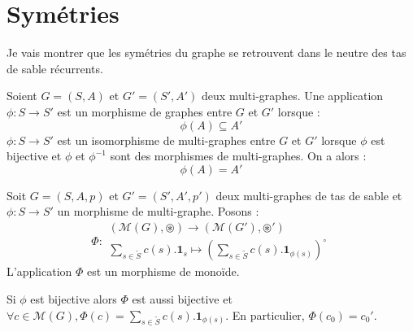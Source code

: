 
\section{Symétries}
Je vais montrer que les symétries du graphe se retrouvent dans le neutre des tas
de sable récurrents.

\begin{definition}
Soient $G = (S, A)$ et $G' = (S', A')$ deux multi-graphes.
Une application $\phi: S \rightarrow S'$ est un morphisme de graphes entre $G$ et $G'$ lorsque :
$$
\phi(A) \subseteq A'
$$
$\phi: S \rightarrow S'$ est un isomorphisme de multi-graphes entre $G$ et $G'$
lorsque $\phi$ est bijective et $\phi$ et $\phi^{-1}$ sont des morphismes de
multi-graphes. On a alors :
$$
\phi(A) = A'
$$
\end{definition}

\begin{theoreme}
Soit $G = (S, A, p)$ et $G' = (S', A', p')$ deux multi-graphes de tas de sable et $\phi: S \rightarrow S'$ un morphisme de multi-graphe.
Posons : $$\Phi: \begin{matrix}
\left(\mathcal{M}(G), \circledast \right) \rightarrow
\left(\mathcal{M}(G'), \circledast' \right) \\
\displaystyle \sum_{s \in \widetilde{S}} c(s) . \mathbf{1}_s \mapsto
\left( \sum_{s \in \widetilde{S}} c(s) . \mathbf{1}_{\phi(s)} \right)^\circ
\end{matrix}$$
L'application $\Phi$ est un morphisme de monoïde.

Si $\phi$ est bijective alors $\Phi$ est aussi bijective et
$\forall c \in \mathcal{M}(G), \Phi(c) = \sum_{s \in \widetilde{S}}
c(s) . \mathbf{1}_{\phi(s)}$.
En particulier, $\Phi(c_0) = c_0'$.
\end{theoreme}

